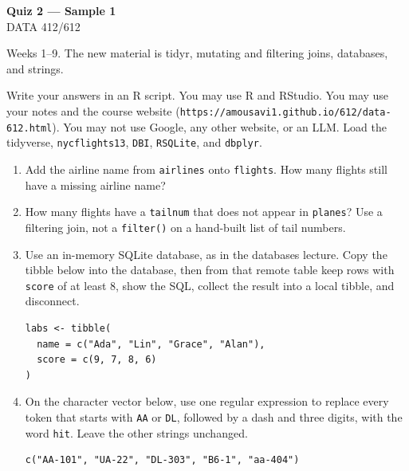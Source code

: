 \documentclass[11pt]{article}
\begin{document}
\begin{center}
{\LARGE\bfseries Quiz 2 --- Sample 1}\\[0.35em]
DATA 412/612
\end{center}

\vspace{0.25em}

Weeks 1--9. The new material is tidyr, mutating and filtering
joins, databases, and strings.

Write your answers in an R script. You may use R and RStudio.
You may use your notes and the course website
(\texttt{https://amousavi1.github.io/612/data-612.html}).
You may not use Google, any other website, or an LLM.
Load the tidyverse, \texttt{nycflights13}, \texttt{DBI},
\texttt{RSQLite}, and \texttt{dbplyr}.

\begin{enumerate}
\item Add the airline name from \texttt{airlines} onto \texttt{flights}.
How many flights still have a missing airline name?

\item How many flights have a \texttt{tailnum} that does not appear in
\texttt{planes}? Use a filtering join, not a \texttt{filter()} on a
hand-built list of tail numbers.

\item Use an in-memory SQLite database, as in the databases lecture.
Copy the tibble below into the database, then from that remote table
keep rows with \texttt{score} of at least 8, show the SQL, collect
the result into a local tibble, and disconnect.

\begin{lstlisting}
labs <- tibble(
  name = c("Ada", "Lin", "Grace", "Alan"),
  score = c(9, 7, 8, 6)
)
\end{lstlisting}

\item On the character vector below, use one regular expression to
replace every token that starts with \texttt{AA} or \texttt{DL},
followed by a dash and three digits, with the word \texttt{hit}.
Leave the other strings unchanged.

\begin{lstlisting}
c("AA-101", "UA-22", "DL-303", "B6-1", "aa-404")
\end{lstlisting}
\end{enumerate}
\end{document}
